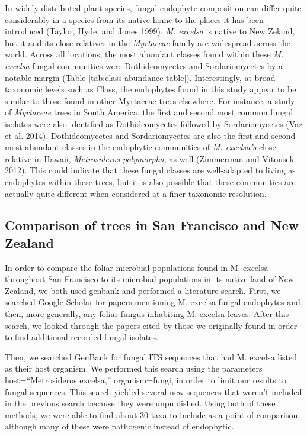 \documentclass[fleqn,10pt,lineno]{wlpeerj} %
\begin{document}
In widely-distributed plant species, fungal endophyte composition can differ quite considerably in a species from its native home to the places it has been introduced (Taylor, Hyde, and Jones 1999). \emph{M. excelsa} is native to New Zeland, but it and its close relatives in the \emph{Myrtaceae} family are widespread across the world. Across all locations, the most abundant classes found within these \emph{M. excelsa} fungal communities were Dothideomycetes and Sordariomycetes by a notable margin (Table \ref{tab:class-abundance-table}). Interestingly, at broad taxonomic levels such as Class, the endophytes found in this study appear to be similar to those found in other Myrtaceae trees elsewhere. For instance, a study of \emph{Myrtaceae} trees in South America, the first and second most common fungal isolates were also identified as Dothideomycetes followed by Sordariomycetes (Vaz et al. 2014). Dothideomycetes and Sordariomycetes are also the first and second most abundant classes in the endophytic communities of \emph{M. excelsa's} close relative in Hawaii, \emph{Metrosideros polymorpha}, as well (Zimmerman and Vitousek 2012). This could indicate that these fungal classes are well-adapted to living as endophytes within these trees, but it is also possible that these communities are actually quite different when considered at a finer taxonomic resolution.

\hypertarget{comparison-of-trees-in-san-francisco-and-new-zealand}{%
\subsection*{Comparison of trees in San Francisco and New Zealand}\label{comparison-of-trees-in-san-francisco-and-new-zealand}}

In order to compare the foliar microbial populations found in M. excelsa throughout San Francisco to its microbial populations in its native land of New Zealand, we both used genbank and performed a literature search. First, we searched Google Scholar for papers mentioning M. excelsa fungal endophytes and then, more generally, any foliar fungus inhabiting M. excelsa leaves. After this search, we looked through the papers cited by those we originally found in order to find additional recorded fungal isolates.

Then, we searched GenBank for fungal ITS sequences that had M. excelsa listed as their host organism. We performed this search using the parameters host=``Metrosideros excelsa,'' organism=fungi, in order to limit our results to fungal sequences. This search yielded several new sequences that weren't included in the previous search because they were unpublished. Using both of these methods, we were able to find about 30 taxa to include as a point of comparison, although many of these were pathogenic instead of endophytic.
\end{document}
